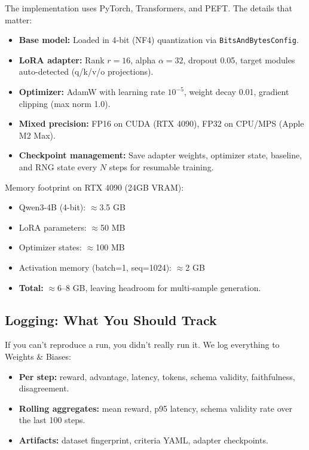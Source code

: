 \documentclass[11pt]{article}
\begin{document}
The implementation uses PyTorch, Transformers, and PEFT.
The details that matter:
\begin{itemize}[leftmargin=12pt]
    \item \textbf{Base model:} Loaded in 4-bit (NF4) quantization via \texttt{BitsAndBytesConfig}.
    \item \textbf{LoRA adapter:} Rank $r=16$, alpha $\alpha=32$, dropout 0.05, target modules auto-detected (q/k/v/o projections).
    \item \textbf{Optimizer:} AdamW with learning rate $10^{-5}$, weight decay 0.01, gradient clipping (max norm 1.0).
    \item \textbf{Mixed precision:} FP16 on CUDA (RTX 4090), FP32 on CPU/MPS (Apple M2 Max).
    \item \textbf{Checkpoint management:} Save adapter weights, optimizer state, baseline, and RNG state every $N$ steps for resumable training.
\end{itemize}

Memory footprint on RTX 4090 (24GB VRAM):
\begin{itemize}[leftmargin=12pt]
    \item Qwen3-4B (4-bit): $\approx$3.5 GB
    \item LoRA parameters: $\approx$50 MB
    \item Optimizer states: $\approx$100 MB
    \item Activation memory (batch=1, seq=1024): $\approx$2 GB
    \item \textbf{Total:} $\approx$6--8 GB, leaving headroom for multi-sample generation.
\end{itemize}

\subsection{Logging: What You Should Track}

If you can't reproduce a run, you didn't really run it.
We log everything to Weights \& Biases:
\begin{itemize}[leftmargin=12pt]
    \item \textbf{Per step:} reward, advantage, latency, tokens, schema validity, faithfulness, disagreement.
    \item \textbf{Rolling aggregates:} mean reward, p95 latency, schema validity rate over the last 100 steps.
    \item \textbf{Artifacts:} dataset fingerprint, criteria YAML, adapter checkpoints.
\end{itemize}
\end{document}
